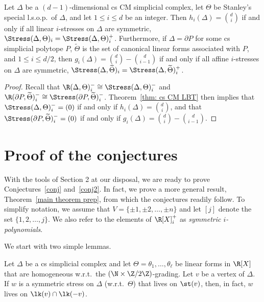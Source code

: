 \begin{coro}\label{cor: minimal h_2 -> symmetry}
	Let $\Delta$ be a $(d-1)$-dimensional cs CM simplicial complex, let $\Theta$ be Stanley's special l.s.o.p.~of $\Delta$, and let $1\leq i\leq d$ be an integer. Then $h_{i}(\Delta)=\binom{d}{i}$ if and only if all linear $i$-stresses on $\Delta$ are symmetric, \ie $\Stress(\Delta, \Theta)_{i}=\Stress(\Delta, \Theta)^+_{i}$. Furthermore, if $\Delta=\partial P$ for some cs simplicial polytope $P$, $\widetilde{\Theta}$ is the set of canonical linear forms associated with $P$, and $1\leq i\leq d/2$, then $g_i(\Delta)=\binom{d}{i}-\binom{d}{i-1}$ if and only if all affine $i$-stresses on $\Delta$ are symmetric, \ie $\Stress(\Delta, \widetilde{\Theta})_{i}=\Stress(\Delta, \widetilde{\Theta})^+_{i}$.
\end{coro}
\begin{proof}
Recall that $\R(\Delta,\Theta)^-_i \cong \Stress(\Delta,\Theta)^-_i$ and $\R(\partial P, \widetilde{\Theta})^-_i \cong \Stress(\partial P, \widetilde{\Theta})^-_i$.	Theorem~\ref{thm: cs CM LBT} then implies that $\Stress(\Delta, \Theta)^-_i=(0)$ if and only if $h_i(\Delta)=\binom{d}{i}$, and that $\Stress(\partial P, \widetilde{\Theta})^-_i=(0)$ if and only if $g_i(\Delta)=\binom{d}{i}-\binom{d}{i-1}$.
\end{proof}




\section{Proof of the conjectures}
With the tools of Section 2 at our disposal, we are ready to prove Conjectures~\ref{conj} and~\ref{conj2}. In fact, we prove a more general result, Theorem~\ref{main theorem prep}, from which the conjectures readily follow. To simplify notation, we assume that $V=\{\pm 1,\pm 2,\ldots,\pm n\}$ and let $[j]$ denote the set $\{1,2,\ldots,j\}$. We also refer to the elements of $\R[X]^+_i$ as \emph{symmetric $i$-polynomials}.

We start with two simple lemmas.

\begin{lemma} \label{lm: support sttau}
	Let $\Delta$ be a cs simplicial complex and let $\Theta=\theta_1,\ldots,\theta_\ell$ be linear forms in $\R[X]$ that are homogeneous w.r.t.~the $(\N \times \Z/2\Z)$-grading. Let $v$ be a vertex of $\Delta$. If $w$ is a symmetric stress on $\Delta$ (w.r.t.~$\Theta$) that lives on $\st(v)$, then, in fact, $w$ lives on $\lk(v)\cap\lk(-v)$.
\end{lemma}

